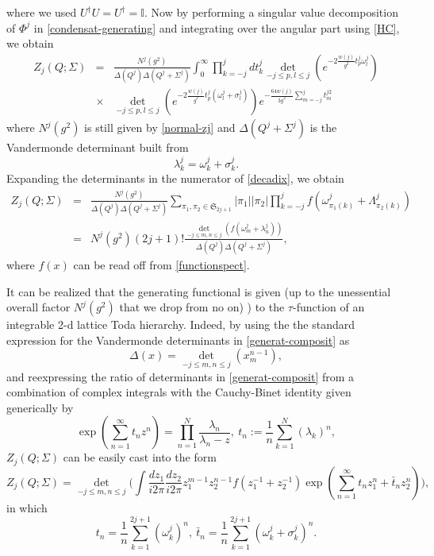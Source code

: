 \documentclass[a4paper,11pt,twoside]{article}
\numberwithin{equation}{section}
\newcommand\bbone{{ \mathbb{I}}}
\theoremstyle{nonumberplain}
\newcounter{and}
\begin{document}
%
where we used $U^\dag U=U^\dag=\bbone$. Now by performing a singular value decomposition of $\Phi^j$ in \eqref{condensat-generating} and integrating over the angular part 
using \eqref{HC}, we obtain%
%
\begin{eqnarray}
Z_j(Q;\Sigma)&=&\frac{N^j(g^2)}{\Delta(Q^j)\Delta(Q^j+\Sigma^j)}\int_0^\infty\prod_{k=-j}^jdt^j_k\det_{-j\le p,l\le j}(e^{-2\frac{w(j)}{g^2}t^j_p\omega^j_{l}})\nonumber\\
&\times&\det_{-j\le p,l\le j}(e^{-2\frac{w(j)}{g^2}t^j_p(\omega^j_{l}+\sigma^j_l)})
e^{-\frac{64w(j)}{3g^2}\sum_{m=-j}^jt^{j2}_m}\label{decadix}
\end{eqnarray}
%
where $N^j(g^2)$ is still given by \eqref{normal-zj} and $\Delta(Q^j+\Sigma^j)$ is the Vandermonde determinant built from%
%
\begin{equation}
\lambda^j_k=\omega^j_k+\sigma^j_k. 
\end{equation}
%
Expanding the determinants in the numerator of \eqref{decadix}, we obtain%
%
\begin{eqnarray}
Z_j(Q;\Sigma)&=&\frac{N^j(g^2)}{\Delta(Q^j)\Delta(Q^j+\Sigma^j)}\sum_{\pi_1,\pi_2\in\mathfrak{S}_{2j+1}}\vert\pi_1 \vert \vert\pi_2 \vert\prod_{k=-j}^jf(\omega^j_{\pi_1(k)}+\Lambda^j_{\pi_2(k)})\nonumber\\
&=&N^j(g^2)(2j+1)! \frac{\det_{-j\le m,n\le j}(f(\omega^j_m+\lambda^j_n))}{\Delta(Q^j)\Delta(Q^j+\Sigma^j)}\label{generat-composit},
\end{eqnarray}
%
where $f(x)$ can be read off from \eqref{functionspect}.\par%
%
It can be realized that the generating functional is given (up to the unessential overall factor $N^j(g^2)$ that we drop from no on)  ) to the $\tau$-function of an integrable 2-d lattice Toda hierarchy. Indeed, by using the the standard expression for the Vandermonde determinants in \eqref{generat-composit} as%
%
\begin{equation}
\Delta(x)=\det_{-j\le m,n\le j}(x_m^{n-1}),
\end{equation}
%
and reexpressing the ratio of determinants in \eqref{generat-composit} from a combination of complex integrals with the Cauchy-Binet identity given generically by%
%
\begin{equation}
\exp(\sum_{n=1}^\infty t_nz^n)=\prod_{n=1}^{N}\frac{\lambda_n}{\lambda_n-z},\ t_n:=\frac{1}{n}\sum_{k=1}^{N}(\lambda_k)^n,
\end{equation}
%
$Z_j(Q;\Sigma)$ can be easily cast into the form%
%
\begin{equation}
Z_j(Q;\Sigma)=\det_{-j\le m,n\le j}\big(\int\frac{dz_1}{i2\pi}\frac{dz_2}{i2\pi}z_1^{m-1}z_2^{n-1} f(z_1^{-1}+z_2^{-1})\exp(\sum_{n=1}^\infty t_nz_1^n+ \bar{t}_nz_2^n) \big)\label{tau-toda},
\end{equation}
%
in which%
%
\begin{equation}
t_n=\frac{1}{n}\sum_{k=1}^{2j+1}(\omega^j_k)^n,\  \bar{t}_n=\frac{1}{n}\sum_{k=1}^{2j+1}(\omega^j_k+\sigma^j_k)^n\label{time-variable}.
\end{equation}
\end{document}
